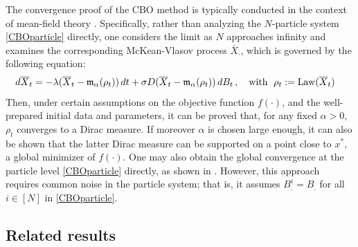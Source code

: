 \documentclass[12pt]{amsart}
\newcommand{\dt}{{\rm d} t}
\newcommand{\rd}{{\rm d} }
\newcommand{\OX}{{\overline{X}}}
\numberwithin{equation}{section}
\begin{document}
The convergence proof of the CBO method is typically conducted in the context of mean-field theory \cite{fornasier2024consensus,carrillo2018analytical}. Specifically, rather than analyzing the $N$-particle system \eqref{CBOparticle} directly, one considers the limit as $N$ approaches infinity and examines the corresponding McKean-Vlasov process $\OX_{\cdot}$, which is governed by the following equation:
\begin{equation}\label{CBO}
\begin{aligned}
    \rd \OX_t & =-\lambda(\OX_t-\mathfrak{m}_{\alpha}(\rho_t)) \, \dt + \sigma D(\OX_t-\mathfrak{m}_{\alpha}(\rho_t)) \, \rd B_t\,, \quad \text{with } \; \rho_t:= \text{Law}(\OX_{t})
\end{aligned}
\end{equation}
Then, under certain assumptions on the objective function $f(\cdot)$, and the well-prepared initial data and parameters, it can be proved  that, for any fixed $\alpha>0$, $\rho_t$ converges to a Dirac measure. If moreover $\alpha$ is chosen large enough, it can also be shown that the latter Dirac measure can be supported on a point close to $x^*$, a global minimizer of $f(\cdot)$. One may also obtain the global convergence at the particle level \eqref{CBOparticle} directly, as shown in \cite{ha2020convergence,ha2021convergence}. However, this approach requires common noise in the particle system; that is, it assumes \( B^i_. = B_. \) for all \( i \in [N] \) in \eqref{CBOparticle}.

\subsection{Related results}
\end{document}
